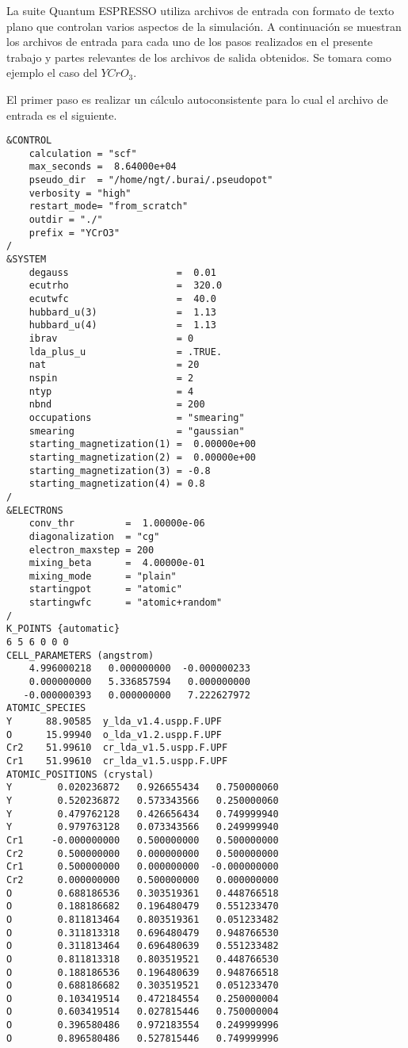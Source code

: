 La suite Quantum ESPRESSO utiliza archivos de entrada con formato de texto plano que controlan varios aspectos de la simulaci\'on. A continuaci\'on se muestran los archivos de entrada para cada uno de los pasos realizados en el presente trabajo y partes relevantes de los archivos de salida obtenidos. Se tomara como ejemplo el caso del $YCrO_{3}$.

\noindent El primer paso es realizar un c\'alculo autoconsistente para lo cual el archivo de entrada es el siguiente.

\lstset{breaklines=true}
\begin{lstlisting}
&CONTROL
    calculation = "scf"
    max_seconds =  8.64000e+04
    pseudo_dir  = "/home/ngt/.burai/.pseudopot"
    verbosity = "high"
    restart_mode= "from_scratch"
    outdir = "./"
    prefix = "YCrO3"
/
&SYSTEM
    degauss                   =  0.01
    ecutrho                   =  320.0
    ecutwfc                   =  40.0
    hubbard_u(3)              =  1.13
    hubbard_u(4)              =  1.13
    ibrav                     = 0
    lda_plus_u                = .TRUE.
    nat                       = 20
    nspin                     = 2
    ntyp                      = 4
    nbnd                      = 200
    occupations               = "smearing"
    smearing                  = "gaussian"
    starting_magnetization(1) =  0.00000e+00
    starting_magnetization(2) =  0.00000e+00
    starting_magnetization(3) = -0.8
    starting_magnetization(4) = 0.8
/
&ELECTRONS
    conv_thr         =  1.00000e-06
    diagonalization  = "cg"
    electron_maxstep = 200
    mixing_beta      =  4.00000e-01
    mixing_mode      = "plain"
    startingpot      = "atomic"
    startingwfc      = "atomic+random"
/
K_POINTS {automatic}
6 5 6 0 0 0
CELL_PARAMETERS (angstrom)
    4.996000218   0.000000000  -0.000000233
    0.000000000   5.336857594   0.000000000
   -0.000000393   0.000000000   7.222627972
ATOMIC_SPECIES
Y      88.90585  y_lda_v1.4.uspp.F.UPF
O      15.99940  o_lda_v1.2.uspp.F.UPF
Cr2    51.99610  cr_lda_v1.5.uspp.F.UPF
Cr1    51.99610  cr_lda_v1.5.uspp.F.UPF
ATOMIC_POSITIONS (crystal)
Y        0.020236872   0.926655434   0.750000060
Y        0.520236872   0.573343566   0.250000060
Y        0.479762128   0.426656434   0.749999940
Y        0.979763128   0.073343566   0.249999940
Cr1     -0.000000000   0.500000000   0.500000000
Cr2      0.500000000   0.000000000   0.500000000
Cr1      0.500000000   0.000000000  -0.000000000
Cr2      0.000000000   0.500000000   0.000000000
O        0.688186536   0.303519361   0.448766518
O        0.188186682   0.196480479   0.551233470
O        0.811813464   0.803519361   0.051233482
O        0.311813318   0.696480479   0.948766530
O        0.311813464   0.696480639   0.551233482
O        0.811813318   0.803519521   0.448766530
O        0.188186536   0.196480639   0.948766518
O        0.688186682   0.303519521   0.051233470
O        0.103419514   0.472184554   0.250000004
O        0.603419514   0.027815446   0.750000004
O        0.396580486   0.972183554   0.249999996
O        0.896580486   0.527815446   0.749999996
\end{lstlisting}

